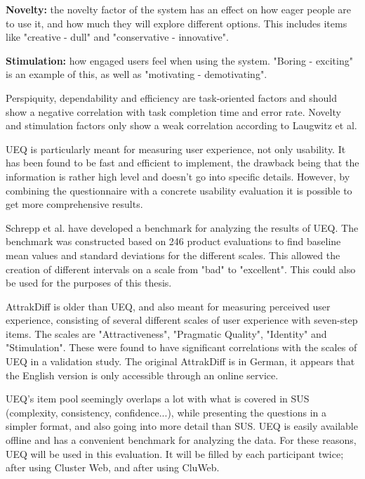 \textbf{Novelty:} the novelty factor of the system has an effect on how eager people are to use it, and how much they will explore different options. This includes items like "creative - dull" and "conservative - innovative".

\textbf{Stimulation:} how engaged users feel when using the system. "Boring - exciting" is an example of this, as well as "motivating - demotivating".

Perspiquity, dependability and efficiency are task-oriented factors and should show a negative correlation with task completion time and error rate. Novelty and stimulation factors only show a weak correlation according to Laugwitz et al. \cite{laugwitz2008construction}

UEQ is particularly meant for measuring user experience, not only usability. It has been found to be fast and efficient to implement, the drawback being that the information is rather high level and doesn't go into specific details. However, by combining the questionnaire with a concrete usability evaluation it is possible to get more comprehensive results. \cite{schrepp2014applying, rauschenberger2013efficient}

Schrepp et al. have developed a benchmark for analyzing the results of UEQ. The benchmark was constructed based on 246 product evaluations to find baseline mean values and standard deviations for the different scales. This allowed the creation of different intervals on a scale from "bad" to "excellent". This could also be used for the purposes of this thesis. \cite{schrepp2017construction}

AttrakDiff is older than UEQ, and also meant for measuring perceived user experience, consisting of several different scales of user experience with seven-step items. The scales are "Attractiveness", "Pragmatic Quality", "Identity" and "Stimulation". These were found to have significant correlations with the scales of UEQ in a validation study. \cite{laugwitz2008construction} The original AttrakDiff is in German, it appears that the English version is only accessible through an online service. \cite{attrakdiff}

UEQ's item pool seemingly overlaps a lot with what is covered in SUS (complexity, consistency, confidence...), while presenting the questions in a simpler format, and also going into more detail than SUS. UEQ is easily available offline and has a convenient benchmark for analyzing the data. For these reasons, UEQ will be used in this evaluation. It will be filled by each participant twice; after using Cluster Web, and after using CluWeb.

